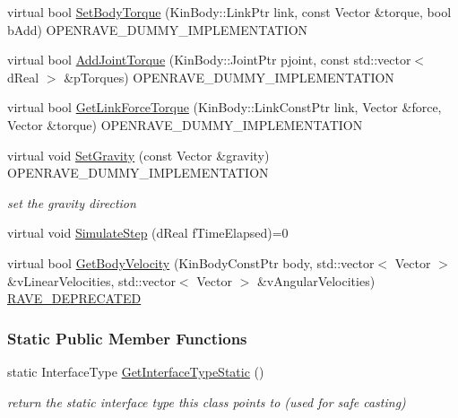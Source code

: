 \begin{DoxyCompactItemize}
\item 
virtual bool \hyperlink{classOpenRAVE_1_1PhysicsEngineBase_a88e1824a57094ca3795b76147fa89430}{SetBodyTorque} (KinBody::LinkPtr link, const Vector \&torque, bool bAdd) OPENRAVE\_\-DUMMY\_\-IMPLEMENTATION
\item 
virtual bool \hyperlink{classOpenRAVE_1_1PhysicsEngineBase_ac967d28c3b1f7df4280dc32b25bc9227}{AddJointTorque} (KinBody::JointPtr pjoint, const std::vector$<$ dReal $>$ \&pTorques) OPENRAVE\_\-DUMMY\_\-IMPLEMENTATION
\item 
virtual bool \hyperlink{classOpenRAVE_1_1PhysicsEngineBase_ac1814e555930327871aa74a002eb11ec}{GetLinkForceTorque} (KinBody::LinkConstPtr link, Vector \&force, Vector \&torque) OPENRAVE\_\-DUMMY\_\-IMPLEMENTATION
\item 
virtual void \hyperlink{classOpenRAVE_1_1PhysicsEngineBase_abf9cb070312280c553bfb29079ecb5ed}{SetGravity} (const Vector \&gravity) OPENRAVE\_\-DUMMY\_\-IMPLEMENTATION
\begin{DoxyCompactList}\small\item\em set the gravity direction \item\end{DoxyCompactList}\item 
virtual void \hyperlink{classOpenRAVE_1_1PhysicsEngineBase_ad060957d4850f20600b9d99732912fef}{SimulateStep} (dReal fTimeElapsed)=0
\item 
virtual bool \hyperlink{classOpenRAVE_1_1PhysicsEngineBase_a1a58013a452eea3921fb0ddcfb263813}{GetBodyVelocity} (KinBodyConstPtr body, std::vector$<$ Vector $>$ \&vLinearVelocities, std::vector$<$ Vector $>$ \&vAngularVelocities) \hyperlink{namespaceOpenRAVE_af23fc4c2c72950a8c02f38ef71680bc6}{RAVE\_\-DEPRECATED}
\end{DoxyCompactItemize}
\subsubsection*{Static Public Member Functions}
\begin{DoxyCompactItemize}
\item 
\hypertarget{classOpenRAVE_1_1PhysicsEngineBase_affeafe65e7c4094f282d273dedbf069b}{
static InterfaceType \hyperlink{classOpenRAVE_1_1PhysicsEngineBase_affeafe65e7c4094f282d273dedbf069b}{GetInterfaceTypeStatic} ()}
\label{classOpenRAVE_1_1PhysicsEngineBase_affeafe65e7c4094f282d273dedbf069b}

\begin{DoxyCompactList}\small\item\em return the static interface type this class points to (used for safe casting) \item\end{DoxyCompactList}\end{DoxyCompactItemize}


